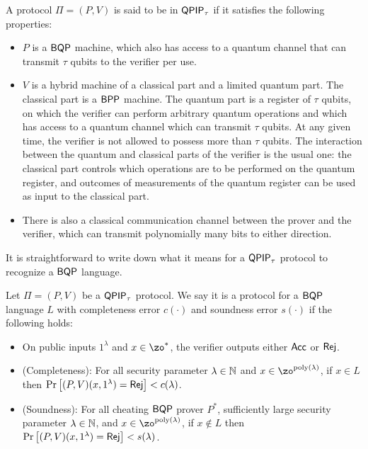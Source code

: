 \begin{definition}
    A protocol $\Pi=(P, V)$ is said to be in $\operatorname{\mathsf{QPIP}}_\tau$ if it satisfies the following properties:
    \begin{itemize}
        \item $P$ is a $\operatorname{\mathsf{BQP}}$ machine, which also has access to a quantum channel that can transmit $\tau$ qubits to the verifier per use.
        \item $V$ is a hybrid machine of a classical part and a limited quantum part. The classical part is a $\operatorname{\mathsf{BPP}}$ machine. The quantum part is a register of $\tau$ qubits, on which the verifier can perform arbitrary quantum operations and which has access to a quantum channel which can transmit $\tau$ qubits. At any given time, the verifier is not allowed to possess more than $\tau$ qubits. The interaction between the quantum and classical parts of the verifier is the usual one: the classical part controls which operations are to be performed on the quantum register, and outcomes of measurements of the quantum register can be used as input to the classical part.
        \item There is also a classical communication channel between the prover and the verifier, which can transmit polynomially many bits to either direction.
    \end{itemize}
\end{definition}

It is straightforward to write down what it means for a $\operatorname{\mathsf{QPIP}}_\tau$ protocol to recognize a $\operatorname{\mathsf{BQP}}$ language.

\begin{definition}
    Let $\Pi=(P, V)$ be a $\operatorname{\mathsf{QPIP}}_\tau$ protocol.
    We say it is a protocol for a $\operatorname{\mathsf{BQP}}$ language $L$ with completeness error $c(\cdot)$ and soundness error $s(\cdot)$ if the following holds:
\begin{itemize}
        \item On public inputs $1^\lambda$ and $x\in\zo^*$, the verifier outputs either $\mathsf{Acc}$ or $\mathsf{Rej}$.
        \item (Completeness): For all security parameter $\lambda\in\mathbb{N}$ and $x\in\zo^{\poly(\lambda)}$, if $x\in L$ then
        $\Pr\left[(P, V)(x, 1^\lambda)=\mathsf{Rej}\right]<c(\lambda)$.
        \item (Soundness): For all cheating $\operatorname{\mathsf{BQP}}$ prover $P^*$, sufficiently large security parameter $\lambda\in\mathbb{N}$, and $x\in\zo^{\poly(\lambda)}$, if $x \notin L$ then $\Pr\left[(P, V)(x, 1^\lambda)=\mathsf{Rej}\right]<s(\lambda)$.
    \end{itemize}
\end{definition}

